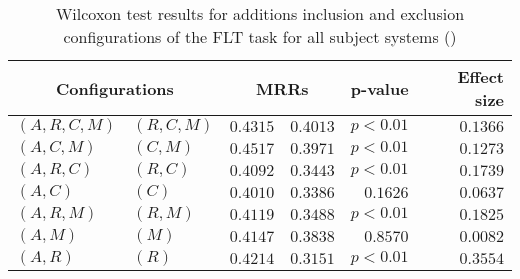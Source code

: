 
\begin{table}
\begin{spacing}{1.2}
\centering
\caption{Wilcoxon test results for additions inclusion and exclusion configurations of the FLT task for all subject systems (\ctwo)}
\label{table:versus-wilcox-all-flt-additions}
\begin{tabular}{ll|rr|rr}
\toprule
      \multicolumn{2}{c|}{Configurations} &                \multicolumn{2}{c|}{MRRs} &        p-value & Effect size \\
\midrule
 $(A,R,C,M)$ &  $(R,C,M)$ &  $\bm{0.4315}$ &  $0.4013$ & $p<0.01$ &    $0.1366$ \\
   $(A,C,M)$ &    $(C,M)$ &  $\bm{0.4517}$ &  $0.3971$ & $p<0.01$ &    $0.1273$ \\
   $(A,R,C)$ &    $(R,C)$ &  $\bm{0.4092}$ &  $0.3443$ & $p<0.01$ &    $0.1739$ \\
     $(A,C)$ &      $(C)$ &  $\bm{0.4010}$ &  $0.3386$ & $0.1626$ &    $0.0637$ \\
   $(A,R,M)$ &    $(R,M)$ &  $\bm{0.4119}$ &  $0.3488$ & $p<0.01$ &    $0.1825$ \\
     $(A,M)$ &      $(M)$ &  $\bm{0.4147}$ &  $0.3838$ & $0.8570$ &    $0.0082$ \\
     $(A,R)$ &      $(R)$ &  $\bm{0.4214}$ &  $0.3151$ & $p<0.01$ &    $0.3554$ \\
\bottomrule
\end{tabular}

\end{spacing}
\end{table}

